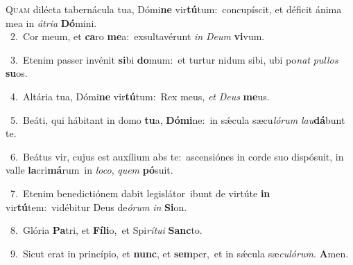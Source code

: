\lettrine{\initial\textcolor{\initialcolor}{Q}}{uam} dilécta tabernácula tua, Dómi\textbf{ne} vir\-\textbf{tú}\-tum:~\star concupíscit, et déficit ánima mea in \textit{á}\-\textit{tri}\textit{a} \textbf{Dó}\-mini.\\
{\numbfont\textcolor{\numbcolor}{~2.}}~Cor meum, et \textbf{ca}\-ro \textbf{me}\-a:~\star exsultavérunt \textit{in} \textit{De}\-\textit{um} \textbf{vi}\-vum.\par
{\numbfont\textcolor{\numbcolor}{~3.}}~Etenim passer invénit \textbf{si}\-bi \textbf{do}\-mum:~\star et turtur nidum sibi, ubi po\textit{nat} \textit{pul}\-\textit{los} \textbf{su}\-os.\par
{\numbfont\textcolor{\numbcolor}{~4.}}~Altária tua, Dómi\textbf{ne} vir\-\textbf{tú}\-tum:~\star Rex meus, \textit{et} \textit{De}\-\textit{us} \textbf{me}\-us.\par
{\numbfont\textcolor{\numbcolor}{~5.}}~Beáti, qui hábitant in domo \textbf{tu}\-a, \textbf{Dó}\-\textbf{mi}ne:~\star in sǽcula sæcu\-\textit{ló}\-\textit{rum} \textit{lau}\-\textbf{dá}bunt te.\par
{\numbfont\textcolor{\numbcolor}{~6.}}~Beátus vir, cujus est auxílium abs te:~\dagger ascensiónes in corde suo dispósuit, in valle \textbf{la}\-cri\-\textbf{má}\-rum~\star in \textit{lo}\-\textit{co}, \textit{quem} \textbf{pó}\-suit.\par
{\numbfont\textcolor{\numbcolor}{~7.}}~Etenim benedictiónem dabit legislátor~\dagger ibunt de virtúte \textbf{in} vir\-\textbf{tú}\-tem:~\star vidébitur Deus de\-\textit{ó}\-\textit{rum} \textit{in} \textbf{Si}\-on.\par
{\numbfont\textcolor{\numbcolor}{~8.}}~Glória \textbf{Pa}\-tri, et \textbf{Fí}\-\textbf{li}o,~\star et Spi\-\textit{rí}\-\textit{tu}\textit{i} \textbf{Sanc}\-to.\par
{\numbfont\textcolor{\numbcolor}{~9.}}~Sicut erat in princípio, et \textbf{nunc}\-, et \textbf{sem}\-per,~\star et in sǽcula sæ\-\textit{cu}\-\textit{ló}\textit{rum}. \textbf{A}\-men.\par
